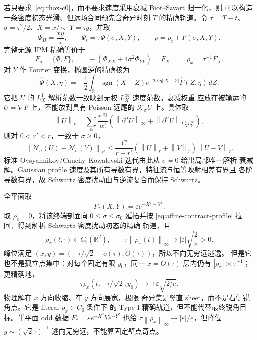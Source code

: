 \documentclass[11pt,a4paper,fontset=fandol]{ctexart}
\newcommand{\norm}[1]{\left\lVert #1\right\rVert}
\begin{document}
若只要求~\eqref{eq:rhox-c0}，而不要求速度采用衰减 Biot--Savart 归一化，则
可以构造一条密度初态光滑、但远场合同预先含奇异时刻 $T$ 的精确轨道。令
$\tau=T-t$、
$\sigma=\tau^2/2$、$X=x/\tau$、$Y=\tau y$，并取
\begin{equation}
  \Psi_H=\frac{xy}{\tau},\qquad
  \Psi_s=\tau\Phi(\sigma,X,Y),\qquad
  \rho=\rho_c+F(\sigma,X,Y).
\end{equation}
完整无源 IPM 精确等价于
\begin{equation}
  F_\sigma=\{\Phi,F\},\qquad
  -(\Phi_{XX}+4\sigma^2\Phi_{YY})=F_X,
  \qquad \rho_x=\tau^{-1}F_X.
  \label{eq:affine-contract-profile}
\end{equation}
对 $Y$ 作 Fourier 变换，椭圆逆的精确核为
\begin{equation}
  \widehat\Phi(X,\eta)
  =-\frac12\int_{\mathbb R}\operatorname{sgn}(X-Z)
  e^{-2\sigma|\eta||X-Z|}\widehat F(Z,\eta)\,dZ.
  \label{eq:affine-contract-kernel}
\end{equation}
它把 $U$ 的 $L_X^1$ 解析范数一致映到无权 $L_X^\infty$ 速度范数。衰减权重
应放在被输运的 $U=\nabla F$ 上，不能放到具有 Poisson 远尾的
$\mathcal K_\sigma U$ 上。具体取
\begin{equation}
  \norm{U}_r=\sum_\alpha\frac{r^{|\alpha|}}{\alpha!}
  \left(\norm{\partial^\alpha U}_\infty
  +\norm{\partial^\alpha U}_{L_X^1L_Y^\infty}\right),
\end{equation}
则对 $0<r'<r$，一致于 $\sigma\ge0$，
\begin{equation}
  \norm{\mathcal N_\sigma(U)-\mathcal N_\sigma(V)}_{r'}
  \le\frac{C}{r-r'}(\norm U_r+\norm V_r)\norm{U-V}_r.
\end{equation}
标准 Ovsyannikov/Cauchy--Kowalevski 迭代由此从 $\sigma=0$ 给出局部唯一解析
衰减解。Gaussian profile 速度及其所有导数有界，特征流与恒等映射相差有界且
各阶导数有界，故 Schwartz 密度扰动由与逆流复合而保持 Schwartz。

全平面取
\begin{equation}
  F_*(X,Y)=\varepsilon e^{-X^2-Y^2}.
\end{equation}
取 $\rho_c=0$，将该终端剖面向 $0\le\sigma\le\sigma_0$ 延拓并按
\eqref{eq:affine-contract-profile} 拉回，得到解析 Schwartz 密度扰动初态的精确
轨道，且
\begin{equation}
  \rho_x(t,\cdot)\in C_0(\mathbb R^2),\qquad
  \tau\norm{\rho_x(t)}_\infty
  \longrightarrow |\varepsilon|\sqrt{\frac2e}>0.
  \label{eq:affine-contract-blowup}
\end{equation}
峰位满足 $(x,y)=(\pm\tau/\sqrt2+o(\tau),O(\tau))$，所以不向无穷远逃逸。
但是它也不是孤立点集中：对每个固定有限 $y_0$，同一 $x=O(\tau)$ 层内仍有
$|\rho_x|\asymp\tau^{-1}$；更精确地，
\begin{equation}
  \tau\rho_x(t,\pm\tau/\sqrt2,y_0)
  \longrightarrow\mp\varepsilon\sqrt{2/e}.
\end{equation}
物理解在 $x$ 方向收缩、在 $y$ 方向展宽，极限
奇异集是竖直 sheet，而不是右侧锐角点。它是 literal $\rho_x\in C_0$ 条件下
的 Type-I 精确轨道，但不能代替最终锐角目标。半平面 odd 数据
$F_*=\varepsilon e^{-X^2}Ye^{-Y^2}$ 也给
$\tau\norm{\rho_x}_\infty\to|\varepsilon|/e$，但峰位
$y\sim(\sqrt2\tau)^{-1}$ 逃向无穷远，不能算固定壁点奇点。
\end{document}
